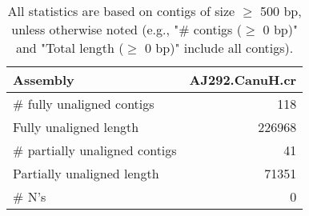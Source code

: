 \documentclass[12pt,a4paper]{article}
\begin{document}
\begin{table}[ht]
\begin{center}
\caption{All statistics are based on contigs of size $\geq$ 500 bp, unless otherwise noted (e.g., "\# contigs ($\geq$ 0 bp)" and "Total length ($\geq$ 0 bp)" include all contigs).}
\begin{tabular}{|l*{1}{|r}|}
\hline
Assembly & AJ292.CanuH.cr \\ \hline
\# fully unaligned contigs & 118 \\ \hline
Fully unaligned length & 226968 \\ \hline
\# partially unaligned contigs & 41 \\ \hline
Partially unaligned length & 71351 \\ \hline
\# N's & 0 \\ \hline
\end{tabular}
\end{center}
\end{table}
\end{document}
